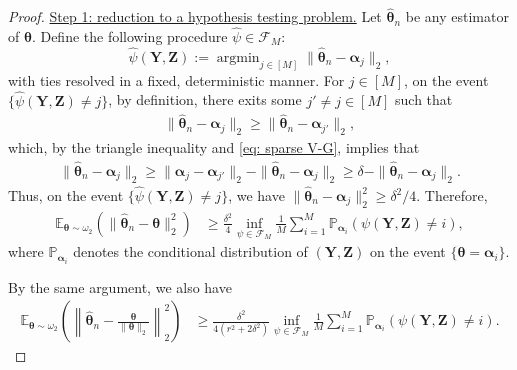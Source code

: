 \documentclass[aos,preprint]{imsart}
\theoremstyle{plain}
\theoremstyle{definition}
\newcommand{\btheta}{\boldsymbol{\theta}}
\newcommand{\balpha}{\boldsymbol{\alpha}}
\newcommand{\hbtheta}{\widehat{\boldsymbol{\theta}}}
\DeclareMathOperator*{\argmin}{argmin}
\newcommand{\bY}{\boldsymbol{Y}}
\newcommand{\bZ}{\boldsymbol{Z}}
\newcommand{\cF}{\mathcal{F}}
\newcommand{\Exp}{\mathbb{E}}
\newcommand{\Pro}{\mathbb{P}}
\begin{document}
\begin{appendix}
\begin{proof}
\medskip

\noindent  
\underline{Step 1: reduction to a hypothesis testing problem.} Let $\hbtheta_n$ be any estimator of $\btheta$. Define the following procedure $\hat{\psi} \in \cF_M$:
$$
\hat{\psi}(\bY,\bZ) := \argmin_{j\in [M]}\|\hbtheta_n-\balpha_j\|_2,
$$
with ties resolved in a fixed, deterministic manner. For $j \in [M]$, on the event $\{\hat{\psi}(\bY,\bZ) \neq j\}$, by definition, there exits some $j' \neq j \in [M]$ such that
\begin{align*}
   \|\hbtheta_n -\balpha_j \|_2 \geq  
      \|\hbtheta_n -\balpha_{j'} \|_2,
\end{align*}
which, by the triangle inequality and \eqref{eq: sparse V-G}, implies that
\begin{align*}
     \|\hbtheta_n -\balpha_j \|_2 \geq  
        \|\balpha_{j} -\balpha_{j'} \|_2
-\|\hbtheta_n -\balpha_j \|_2 \geq \delta -\|\hbtheta_n -\balpha_j \|_2.
\end{align*}
Thus, on the event $\{\hat{\psi}(\bY,\bZ) \neq j\}$, we have  $\|\hbtheta_n -\balpha_j \|_2^2 \geq \delta^2/4$. Therefore,
\begin{equation}\label{eq: aux1}
\begin{aligned}
    \Exp_{\btheta\sim \omega_2} (\|\hbtheta_n -\btheta \|_2^2 ) &\ge \frac{\delta^2}{4} \inf_{\psi \in \cF_M} \frac{1}{M}\sum_{i=1}^M \Pro_{\balpha_i}(\psi(\bY,\bZ) \neq i),
\end{aligned}
\end{equation}
where $\Pro_{\balpha_i}$ denotes the conditional distribution of $(\bY,\bZ)$ on the event $\{\btheta = \balpha_i\}$.

By the same argument, we also have
\begin{equation}\label{eq:aux2}
\begin{aligned}
\Exp_{\btheta\sim \omega_2} \left(\left\|\hbtheta_n -\frac{\btheta}{\|\btheta\|_2} \right\|_2^2 \right) &\ge \frac{\delta^2}{4(r^2+2\delta^2)} \inf_{\psi \in \cF_M} \frac{1}{M}\sum_{i=1}^M \Pro_{\balpha_i}(\psi(\bY,\bZ) \neq i).
\end{aligned}
\end{equation}


\end{proof}
\end{appendix}
\end{document}
